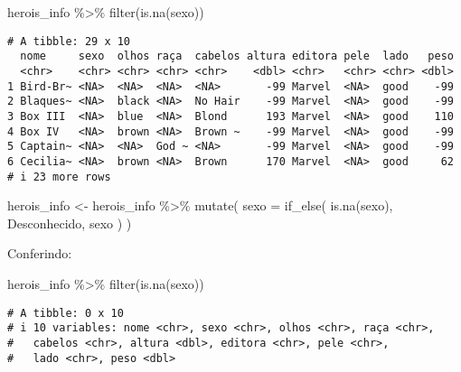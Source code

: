 \documentclass[
  letterpaper,
  DIV=11,
  numbers=noendperiod]{scrreprt}
\newenvironment{Shaded}{\begin{snugshade}}{\end{snugshade}}
\newcommand{\AttributeTok}[1]{\textcolor[rgb]{0.40,0.45,0.13}{#1}}
\newcommand{\FunctionTok}[1]{\textcolor[rgb]{0.28,0.35,0.67}{#1}}
\newcommand{\NormalTok}[1]{\textcolor[rgb]{0.00,0.23,0.31}{#1}}
\newcommand{\OtherTok}[1]{\textcolor[rgb]{0.00,0.23,0.31}{#1}}
\newcommand{\SpecialCharTok}[1]{\textcolor[rgb]{0.37,0.37,0.37}{#1}}
\newcommand{\StringTok}[1]{\textcolor[rgb]{0.13,0.47,0.30}{#1}}
\begin{document}
\begin{enumerate}
\begin{tcolorbox}
\begin{Shaded}
\begin{Highlighting}[]
\NormalTok{herois\_info }\SpecialCharTok{\%\textgreater{}\%} \FunctionTok{filter}\NormalTok{(}\FunctionTok{is.na}\NormalTok{(sexo))}
\end{Highlighting}
\end{Shaded}

\begin{verbatim}
# A tibble: 29 x 10
  nome     sexo  olhos raça  cabelos altura editora pele  lado   peso
  <chr>    <chr> <chr> <chr> <chr>    <dbl> <chr>   <chr> <chr> <dbl>
1 Bird-Br~ <NA>  <NA>  <NA>  <NA>       -99 Marvel  <NA>  good    -99
2 Blaques~ <NA>  black <NA>  No Hair    -99 Marvel  <NA>  good    -99
3 Box III  <NA>  blue  <NA>  Blond      193 Marvel  <NA>  good    110
4 Box IV   <NA>  brown <NA>  Brown ~    -99 Marvel  <NA>  good    -99
5 Captain~ <NA>  <NA>  God ~ <NA>       -99 Marvel  <NA>  good    -99
6 Cecilia~ <NA>  brown <NA>  Brown      170 Marvel  <NA>  good     62
# i 23 more rows
\end{verbatim}

\begin{Shaded}
\begin{Highlighting}[]
\NormalTok{herois\_info }\OtherTok{\textless{}{-}}\NormalTok{  herois\_info }\SpecialCharTok{\%\textgreater{}\%} 
  \FunctionTok{mutate}\NormalTok{(}
    \AttributeTok{sexo =} \FunctionTok{if\_else}\NormalTok{(}
      \FunctionTok{is.na}\NormalTok{(sexo),}
      \StringTok{\textquotesingle{}Desconhecido\textquotesingle{}}\NormalTok{,}
\NormalTok{      sexo}
\NormalTok{    )}
\NormalTok{  )}
\end{Highlighting}
\end{Shaded}

  Conferindo:

\begin{Shaded}
\begin{Highlighting}[]
\NormalTok{herois\_info }\SpecialCharTok{\%\textgreater{}\%} \FunctionTok{filter}\NormalTok{(}\FunctionTok{is.na}\NormalTok{(sexo))}
\end{Highlighting}
\end{Shaded}

\begin{verbatim}
# A tibble: 0 x 10
# i 10 variables: nome <chr>, sexo <chr>, olhos <chr>, raça <chr>,
#   cabelos <chr>, altura <dbl>, editora <chr>, pele <chr>,
#   lado <chr>, peso <dbl>
\end{verbatim}


\end{tcolorbox}
\end{enumerate}
\end{document}
